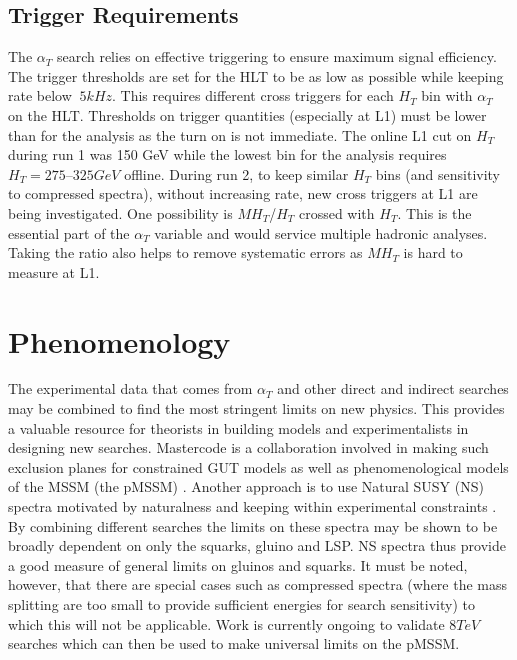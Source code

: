 \subsection{Trigger Requirements}
The $\alpha_T$ search relies on effective triggering to ensure maximum signal efficiency. The trigger thresholds are set for the HLT to be as low as possible while keeping rate below $~5kHz$. This requires different cross triggers for each $H_T$ bin with $\alpha_T$ on the HLT. Thresholds on trigger quantities (especially at L1) must be lower than for the analysis as the turn on is not immediate. The online L1 cut on $H_T$ during run 1 was 150 GeV while the lowest bin for the analysis requires $H_T=275–325 GeV$ offline. During run 2, to keep similar $H_T$ bins (and sensitivity to compressed spectra), without increasing rate, new cross triggers at L1 are being investigated. One possibility is $MH_T$/$H_T$ crossed with $H_T$. This is the essential part of the $\alpha_T$ variable and would service multiple hadronic analyses. Taking the ratio also helps to remove systematic errors as $MH_T$ is hard to measure at L1. 
\section{Phenomenology}
The experimental data that comes from $\alpha_T$ and other direct and indirect searches may be combined to find the most stringent limits on new physics. This provides a valuable resource for theorists in building models and experimentalists in designing new searches. Mastercode is a collaboration involved in making such exclusion planes for constrained GUT models as well as phenomenological models of the MSSM (the pMSSM) \cite{mcode} . Another approach is to use Natural SUSY (NS) spectra motivated by naturalness and keeping within experimental constraints \cite{joliver}. By combining different searches the limits on these spectra may be shown to be broadly dependent on only the squarks, gluino and LSP. NS spectra thus provide a good measure of general limits on gluinos and squarks. It must be noted, however, that there are special cases such as compressed spectra (where the mass splitting are too small to provide sufficient energies for search sensitivity) to which this will not be applicable. Work is currently ongoing to validate $8 TeV$ searches which can then be used to make universal limits on the pMSSM.


